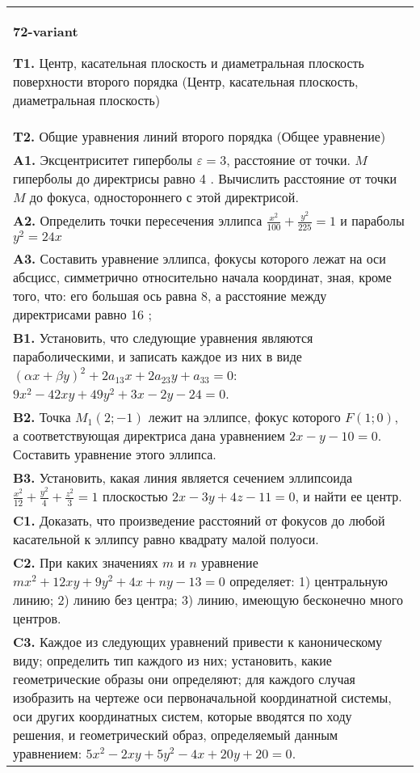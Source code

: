 \documentclass{article}
\begin{document}
\begin{tabular}{m{17cm}}
\textbf{72-variant}
\newline

\textbf{T1.} Центр, касательная плоскость и диаметральная плоскость поверхности второго порядка (Центр, касательная плоскость, диаметральная плоскость) \\
\textbf{T2.} Общие уравнения линий второго порядка (Общее уравнение) \\
\textbf{A1.} Эксцентриситет гиперболы $\varepsilon=3$, расстояние от точки. $M$ гиперболы до директрисы равно 4 . Вычислить расстояние от точки $M$ до фокуса, одностороннего с этой директрисой. \\
\textbf{A2.} Определить точки пересечения эллипса $\frac{x^2}{100}+\frac{y^2}{225}=1$ и параболы $y^2=24 x$ \\
\textbf{A3.} Составить уравнение эллипса, фокусы которого лежат на оси абсцисс, симметрично относительно начала координат, зная, кроме того, что: его большая ось равна 8, а расстояние между директрисами равно 16 ; \\
\textbf{B1.} Установить, что следующие уравнения являются параболическими, и записать каждое из них в виде $(\alpha x+\beta y)^2+2 a_{13} x+2 a_{23} y+a_{33}=0$: $9 x^2-42 x y+49 y^2+3 x-2 y-24=0$. \\
\textbf{B2.} Точка $M_1(2 ;-1)$ лежит на эллипсе, фокус которого $F(1 ; 0)$, а соответствующая директриса дана уравнением $2 x-y-10=0$. Составить уравнение этого эллипса. \\
\textbf{B3.} Установить, какая линия является сечением эллипсоида $\frac{x^2}{12}+\frac{y^2}{4}+\frac{z^2}{3}=1$ плоскостью $2 x-3 y+4 z-11=0$, и найти ее центр. \\
\textbf{C1.} Доказать, что произведение расстояний от фокусов до любой касательной к эллипсу равно квадрату малой полуоси. \\
\textbf{C2.} При каких значениях $m$ и $n$ уравнение $m x^2+12 x y+9 y^2+4 x+n y-13=0$ определяет: 1) центральную линию; 2) линию без центра; 3) линию, имеющую бесконечно много центров. \\
\textbf{C3.} Каждое из следующих уравнений привести к каноническому виду; определить тип каждого из них; установить, какие геометрические образы они определяют; для каждого случая изобразить на чертеже оси первоначальной координатной системы, оси других координатных систем, которые вводятся по ходу решения, и геометрический образ, определяемый данным уравнением: $5 x^2-2 x y+5 y^2-4 x+20 y+20=0$. \\

\end{tabular}
\vspace{1cm}
\end{document}
